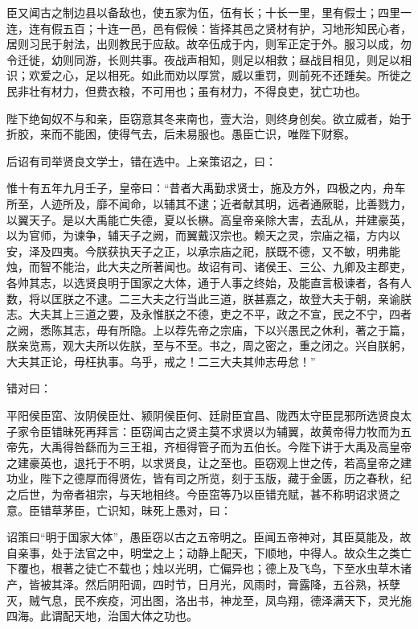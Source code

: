 \documentclass[]{article}
\begin{document}
臣又闻古之制边县以备敌也，使五家为伍，伍有长；十长一里，里有假士；四里一连，连有假五百；十连一邑，邑有假候：皆择其邑之贤材有护，习地形知民心者，居则习民于射法，出则教民于应敌。故卒伍成于内，则军正定于外。服习以成，勿令迁徙，幼则同游，长则共事。夜战声相知，则足以相救；昼战目相见，则足以相识；欢爱之心，足以相死。如此而劝以厚赏，威以重罚，则前死不还踵矣。所徙之民非壮有材力，但费衣粮，不可用也；虽有材力，不得良吏，犹亡功也。

陛下绝匈奴不与和亲，臣窃意其冬来南也，壹大治，则终身创矣。欲立威者，始于折胶，来而不能困，使得气去，后未易服也。愚臣亡识，唯陛下财察。

后诏有司举贤良文学士，错在选中。上亲策诏之，曰：

惟十有五年九月壬子，皇帝曰：``昔者大禹勤求贤士，施及方外，四极之内，舟车所至，人迹所及，靡不闻命，以辅其不逮；近者献其明，远者通厥聪，比善戮力，以翼天子。是以大禹能亡失德，夏以长楙。高皇帝亲除大害，去乱从，并建豪英，以为官师，为谏争，辅天子之阙，而翼戴汉宗也。赖天之灵，宗庙之福，方内以安，泽及四夷。今朕获执天子之正，以承宗庙之祀，朕既不德，又不敏，明弗能烛，而智不能治，此大夫之所著闻也。故诏有司、诸侯王、三公、九卿及主郡吏，各帅其志，以选贤良明于国家之大体，通于人事之终始，及能直言极谏者，各有人数，将以匡朕之不逮。二三大夫之行当此三道，朕甚嘉之，故登大夫于朝，亲谕朕志。大夫其上三道之要，及永惟朕之不德，吏之不平，政之不宣，民之不宁，四者之阙，悉陈其志，毋有所隐。上以荐先帝之宗庙，下以兴愚民之休利，著之于篇，朕亲览焉，观大夫所以佐朕，至与不至。书之，周之密之，重之闭之。兴自朕躬，大夫其正论，毋枉执事。乌乎，戒之！二三大夫其帅志毋怠！''

错对曰：

平阳侯臣窋、汝阴侯臣灶、颍阴侯臣何、廷尉臣宜昌、陇西太守臣昆邪所选贤良太子家令臣错昧死再拜言：臣窃闻古之贤主莫不求贤以为辅翼，故黄帝得力牧而为五帝先，大禹得咎繇而为三王祖，齐桓得管子而为五伯长。今陛下讲于大禹及高皇帝之建豪英也，退托于不明，以求贤良，让之至也。臣窃观上世之传，若高皇帝之建功业，陛下之德厚而得贤佐，皆有司之所览，刻于玉版，藏于金匮，历之春秋，纪之后世，为帝者祖宗，与天地相终。今臣窋等乃以臣错充赋，甚不称明诏求贤之意。臣错草茅臣，亡识知，昧死上愚对，曰：

诏策曰``明于国家大体''，愚臣窃以古之五帝明之。臣闻五帝神对，其臣莫能及，故自亲事，处于法官之中，明堂之上；动静上配天，下顺地，中得人。故众生之类亡下覆也，根著之徒亡不载也；烛以光明，亡偏异也；德上及飞鸟，下至水虫草木诸产，皆被其泽。然后阴阳调，四时节，日月光，风雨时，膏露降，五谷熟，袄孽灭，贼气息，民不疾疫，河出图，洛出书，神龙至，凤鸟翔，德泽满天下，灵光施四海。此谓配天地，治国大体之功也。
\end{document}
